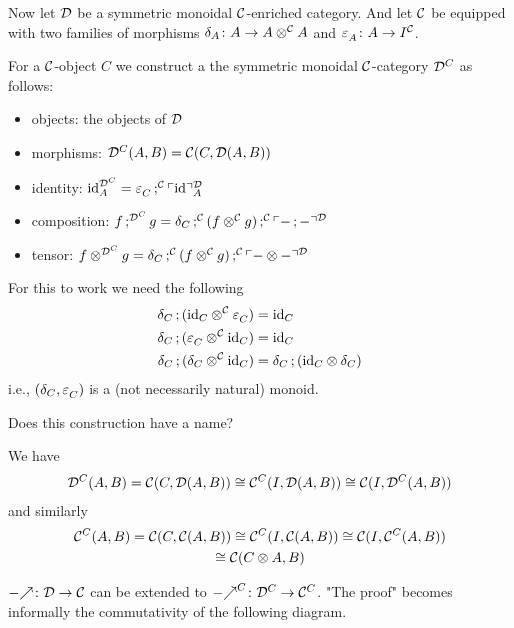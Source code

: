 \documentclass[runningheads,envcountsame]{llncs}
\begin{document}
Now let $\D$ be a symmetric monoidal $\C$-enriched category. And let $\C$ be equipped with two families of morphisms $\dup_A\colon A \to \tensor[\C]{A}{A}$ and $\terminal_A\colon A \to I^\C$.

For a $\C$-object $C$ we construct a the symmetric monoidal $\C$-category $\D^C$ as follows:
\begin{itemize}
    \item objects: the objects of $\D$
    \item morphisms: $\D^C(A, B) = \C(C, \homD{A}{B})$
    \item identity: $\id[\D^C]_A = \comp[\C]{\terminal_C}{\name[\D]{\id}_A}$
    \item composition: $\comp[\D^C]{f}{g} = \comp[\C]{\dup_C}{\comp[\C]{(\tensor[\C]{f}{g})}{\name[\D]{\comp{-}{-}}}}$
    \item tensor: $\tensor[\D^C]{f}{g} = \comp[\C]{\dup_C}{\comp[\C]{(\tensor[\C]{f}{g})}{\name[\D]{\tensor{-}{-}}}}$
\end{itemize}

For this to work we need the following
\begin{align}
    \comp{\dup_C}{(\tensor[\C]{\id_C}{\terminal_C})} &= \id_C \\
    \comp{\dup_C}{(\tensor[\C]{\terminal_C}{\id_C})} &= \id_C \\
    \comp{\dup_C}{(\tensor[\C]{\dup_C}{\id_C})} &= \comp{\dup_C}{(\tensor{\id_C}{\dup_C})}
\end{align}
i.e., $(\dup_C, \terminal_C)$ is a (not necessarily natural) monoid.

Does this construction have a name?

We have 
\begin{gather}
    \D^C(A, B) = \C(C, \homD{A}{B}) \cong \C^C(I, \homD{A}{B}) \cong \C(I, \homJ{A}{\D^C}{B})
\end{gather}
and similarly
\begin{gather}
    \C^C(A, B) = \C(C, \homC{A}{B}) \cong \C^C(I, \homC{A}{B}) \cong \C(I, \homJ{A}{\C^C}{B}) \\
    \cong \C(\tensor{C}{A}, B)
\end{gather}

$\f{-}\colon \D \to \C$ can be extended to $\f{-}^C\colon \D^C \to \C^C$. "The proof" becomes informally the commutativity of the following diagram. \\
\end{document}
